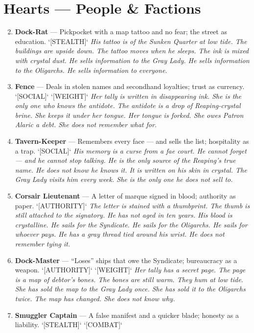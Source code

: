 \section*{Hearts --- People \& Factions}
\label{sec:zakov-people}
\begin{enumerate}
\setcounter{enumi}{1}
\item \textbf{Dock-Rat} --- Pickpocket with a map tattoo and no fear; the street as education. `[STEALTH]`
  \hfill \textit{His tattoo is of the Sunken Quarter at low tide. The buildings are upside down. The tattoo moves when he sleeps. The ink is mixed with crystal dust. He sells information to the Gray Lady. He sells information to the Oligarchs. He sells information to everyone.}
\item \textbf{Fence} --- Deals in stolen names and secondhand loyalties; trust as currency. `[SOCIAL]` `[WEIGHT]`
  \hfill \textit{Her tally is written in disappearing ink. She is the only one who knows the antidote. The antidote is a drop of Reaping-crystal brine. She keeps it under her tongue. Her tongue is forked. She owes Patron Alaric a debt. She does not remember what for.}
\item \textbf{Tavern-Keeper} --- Remembers every face --- and sells the list; hospitality as a trap. `[SOCIAL]`
  \hfill \textit{His memory is a curse from a fae court. He cannot forget --- and he cannot stop talking. He is the only source of the Reaping's true name. He does not know he knows it. It is written on his skin in crystal. The Gray Lady visits him every week. She is the only one he does not sell to.}
\item \textbf{Corsair Lieutenant} --- A letter of marque signed in blood; authority as paper. `[AUTHORITY]`
  \hfill \textit{The letter is stained with a thumbprint. The thumb is still attached to the signatory. He has not aged in ten years. His blood is crystalline. He sails for the Syndicate. He sails for the Oligarchs. He sails for whoever pays. He has a gray thread tied around his wrist. He does not remember tying it.}
\item \textbf{Dock-Master} --- ``Loses'' ships that owe the Syndicate; bureaucracy as a weapon. `[AUTHORITY]` `[WEIGHT]`
  \hfill \textit{Her tally has a secret page. The page is a map of debtor's bones. The bones are still warm. They hum at low tide. She has sold the map to the Gray Lady once. She has sold it to the Oligarchs twice. The map has changed. She does not know why.}
\item \textbf{Smuggler Captain} --- A false manifest and a quicker blade; honesty as a liability. `[STEALTH]` `[COMBAT]`

\end{enumerate}
